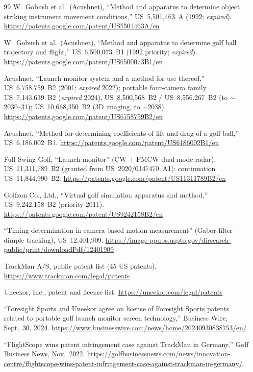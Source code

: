\begin{thebibliography}{99}
W.~Gobush et al.\ (Acushnet), ``Method and apparatus to determine object
striking instrument movement conditions,'' US~5,501,463~A (1992;
\emph{expired}). \url{https://patents.google.com/patent/US5501463A/en}

W.~Gobush et al.\ (Acushnet), ``Method and apparatus to determine golf
ball trajectory and flight,'' US~6,500,073~B1 (1992 priority;
\emph{expired}). \url{https://patents.google.com/patent/US6500073B1/en}

Acushnet, ``Launch monitor system and a method for use thereof,''
US~6,758,759~B2 (2001; \emph{expired} 2022); portable four-camera family
US~7,143,639~B2 (\emph{expired} 2024), US~8,500,568~B2 / US~8,556,267~B2
(to $\sim$2030--31); US~10,668,350~B2 (3D imaging, to $\sim$2038).
\url{https://patents.google.com/patent/US6758759B2/en}

Acushnet, ``Method for determining coefficients of lift and drag of a
golf ball,'' US~6,186,002~B1.
\url{https://patents.google.com/patent/US6186002B1/en}

Full Swing Golf, ``Launch monitor'' (CW + FMCW dual-mode radar),
US~11,311,789~B2 (granted from US~2020/0147470~A1); continuation
US~11,844,990~B2.
\url{https://patents.google.com/patent/US11311789B2/en}

Golfzon Co., Ltd., ``Virtual golf simulation apparatus and method,''
US~9,242,158~B2 (priority 2011).
\url{https://patents.google.com/patent/US9242158B2/en}

``Timing determination in camera-based motion measurement''
(Gabor-filter dimple tracking), US~12,401,909.
\url{https://image-ppubs.uspto.gov/dirsearch-public/print/downloadPdf/12401909}

TrackMan A/S, public patent list (45 US patents).
\url{https://www.trackman.com/legal/patents}

Uneekor, Inc., patent and license list.
\url{https://uneekor.com/legal/patents}

``Foresight Sports and Uneekor agree on license of Foresight Sports
patents related to portable golf launch monitor screen technology,''
Business Wire, Sept.\ 30, 2024.
\url{https://www.businesswire.com/news/home/20240930838753/en/}

``FlightScope wins patent infringement case against TrackMan in
Germany,'' Golf Business News, Nov.\ 2022.
\url{https://golfbusinessnews.com/news/innovation-centre/flightscope-wins-patent-infringement-case-against-trackman-in-germany/}


\end{thebibliography}
